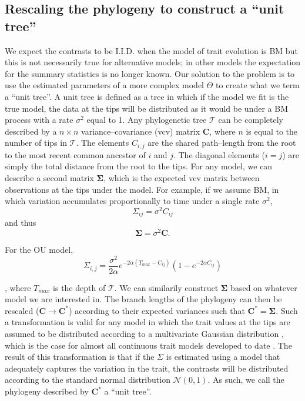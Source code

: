 \documentclass[a4paper,12pt]{article}
\begin{document}
\subsection*{Rescaling the phylogeny to construct a ``unit tree''}

We expect the contrasts to be I.I.D. when the model of trait evolution is BM but this is not necessarily true for alternative models; in other models the expectation for the summary statistics is no longer known. Our solution to the problem is to use the estimated parameters of a more complex model $\Theta$ to create what we term a ``unit tree''. A unit tree is defined as a tree in which if the model we fit is the true model, the data at the tips will be distributed as it would be under a BM process with a rate $\sigma^2$ equal to 1. Any phylogenetic tree $\mathcal{T}$ can be completely described by a $n \times n$ variance--covariance (vcv) matrix $\mathbf{C}$, where $n$ is equal to the number of tips in $\mathcal{T}$. The elements $C_{i,j}$ are the shared path--length from the root to the most recent common ancestor of $i$ and $j$. The diagonal elements ($i = j$) are simply the total distance from the root to the tips. For any model, we can describe a second matrix $\mathbf{\Sigma}$, which is the expected vcv matrix between observations at the tips under the model. For example, if we assume BM, in which variation accumulates proportionally to time under a single rate $\sigma^2$,
\begin{equation}
\Sigma_{ij} = \sigma^2 C_{ij}
\end{equation}
and thus
\begin{equation}
\mathbf{\Sigma} = \sigma^2 \mathbf{C}.
\end{equation}

For the OU model, 
\begin{equation}
\Sigma_{i,j} = \frac{\sigma^2}{2\alpha} e^{-2\alpha (T_{max} - C_{ij})} (1 - e^{-2\alpha C_{ij}})
\end{equation}

\citep{Hansen1997, ButlerKing2004}, where $T_{max}$ is the depth of $\mathcal{T}$.
We can similarily construct $\mathbf{\Sigma}$ based on whatever model we are interested in. The branch lengths of the phylogeny can then be rescaled ($\mathbf{C} \rightarrow \mathbf{C}^*$) according to their expected variances such that $\mathbf{C}^*=\mathbf{\Sigma}$. Such a transformation is valid for any model in which the trait values at the tips are assumed to be distributed according to a multivariate Gaussian distribution \citep{HoAne2013}, which is the case for almost all continuous trait models developed to date \citep{Omeara2012}. The result of this transformation is that if the $\Sigma$ is estimated using a model that adequately captures the variation in the trait, the contrasts will be distributed according to the standard normal distribution $\mathcal{N}(0,1)$. As such, we call the phylogeny described by $\mathbf{C}^*$ a ``unit tree''.
\end{document}

